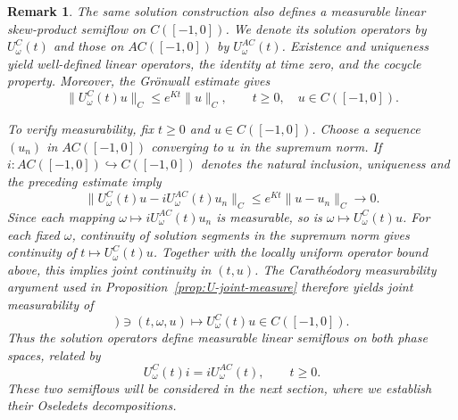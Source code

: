 \documentclass[reqno]{amsart}
\theoremstyle{plain}
\newtheorem{remark}{Remark}[section]
\numberwithin{equation}{section}
\numberwithin{definition}{section}
\begin{document}
\begin{remark}\label{remark-U-notation}
The same solution construction also defines a measurable
linear skew-product semiflow on $C([-1,0])$.
We denote its solution operators by $U_\omega^C(t)$ and
those on $AC([-1,0])$ by $U_\omega^{AC}(t)$.
Existence and uniqueness yield well-defined linear operators,
the identity at time zero, and the cocycle property.
Moreover, the Gr{\"o}nwall estimate gives
\begin{equation*}
    \|U_\omega^C(t)u\|_C
    \leq e^{Kt}\|u\|_C,
    \qquad t\geq0,\quad u\in C([-1,0]).
\end{equation*}

To verify measurability, fix $t\geq0$ and $u\in C([-1,0])$.
Choose a sequence $(u_n)$ in $AC([-1,0])$ converging to $u$
in the supremum norm. If
$i:AC([-1,0])\hookrightarrow C([-1,0])$ denotes the natural
inclusion, uniqueness and the preceding estimate imply
\begin{equation*}
    \|U_\omega^C(t)u-iU_\omega^{AC}(t)u_n\|_C
    \leq e^{Kt}\|u-u_n\|_C
    \to0.
\end{equation*}
Since each mapping
$\omega\mapsto iU_\omega^{AC}(t)u_n$ is measurable,
so is $\omega\mapsto U_\omega^C(t)u$. For each fixed $\omega$, continuity of solution segments
in the supremum norm gives continuity of
$t\mapsto U_\omega^C(t)u$.
Together with the locally uniform operator bound above,
this implies joint continuity in $(t,u)$.
The Carath\'eodory measurability argument used in
Proposition~\ref{prop:U-joint-measure} therefore yields joint measurability of
\begin{equation*}
    [0,\infty)\times\Omega\times C([-1,0])
    \ni(t,\omega,u)\mapsto U_\omega^C(t)u
    \in C([-1,0]).
\end{equation*}
Thus the solution operators define measurable linear
semiflows on both phase spaces, related by
\begin{equation*}
    U_\omega^C(t)i=iU_\omega^{AC}(t),
    \qquad t\geq0.
\end{equation*}
These two semiflows will be considered in the next section,
where we establish their Oseledets decompositions.
\end{remark}
\end{document}
